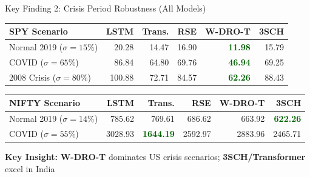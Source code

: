 \documentclass[aspectratio=169,11pt]{beamer}
\begin{document}
\begin{frame}{Key Finding 2: Crisis Period Robustness (All Models)}
\begin{table}
\centering
\footnotesize
\begin{tabular}{lrrrrr}
\toprule
\textbf{SPY Scenario} & \textbf{LSTM} & \textbf{Trans.} & \textbf{RSE} & \textbf{W-DRO-T} & \textbf{3SCH} \\
\midrule
Normal 2019 ($\sigma=15\%$) & 20.28 & 14.47 & 16.90 & \textcolor{darkgreen}{\textbf{11.98}} & 15.79 \\
COVID ($\sigma=65\%$) & 86.84 & 64.80 & 69.76 & \textcolor{darkgreen}{\textbf{46.94}} & 69.25 \\
2008 Crisis ($\sigma=80\%$) & 100.88 & 72.71 & 84.57 & \textcolor{darkgreen}{\textbf{62.26}} & 88.43 \\
\bottomrule
\end{tabular}
\end{table}

\vspace{0.2cm}

\begin{table}
\centering
\footnotesize
\begin{tabular}{lrrrrr}
\toprule
\textbf{NIFTY Scenario} & \textbf{LSTM} & \textbf{Trans.} & \textbf{RSE} & \textbf{W-DRO-T} & \textbf{3SCH} \\
\midrule
Normal 2019 ($\sigma=14\%$) & 785.62 & 769.61 & 686.62 & 663.92 & \textcolor{darkgreen}{\textbf{622.26}} \\
COVID ($\sigma=55\%$) & 3028.93 & \textcolor{darkgreen}{\textbf{1644.19}} & 2592.97 & 2883.96 & 2465.71 \\
\bottomrule
\end{tabular}
\end{table}

\vspace{0.2cm}
\textbf{Key Insight:} \textbf{W-DRO-T} dominates US crisis scenarios; \textbf{3SCH/Transformer} excel in India
\end{frame}
\end{document}
